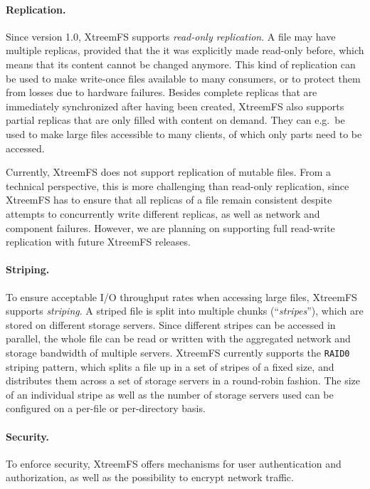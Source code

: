 \documentclass[a4paper,10pt]{book}
\begin{document}
\paragraph{Replication.}
Since version 1.0, XtreemFS supports \emph{read-only replication}. A file may have multiple replicas, provided that the it was explicitly made read-only before, which means that its content cannot be changed anymore. This kind of replication can be used to make write-once files available to many consumers, or to protect them from losses due to hardware failures. Besides complete replicas that are immediately synchronized after having been created, XtreemFS also supports partial replicas that are only filled with content on demand. They can e.g.\ be used to make large files accessible to many clients, of which only parts need to be accessed.

Currently, XtreemFS does not support replication of mutable files. From a technical perspective, this is more challenging than read-only replication, since XtreemFS has to ensure that all replicas of a file remain consistent despite attempts to concurrently write different replicas, as well as network and component failures. However, we are planning on supporting full read-write replication with future XtreemFS releases.

\paragraph{Striping.}
To ensure acceptable I/O throughput rates when accessing large files, XtreemFS supports \emph{striping}. A striped file is split into multiple chunks (``\emph{stripes}''), which are stored on different storage servers. Since different stripes can be accessed in parallel, the whole file can be read or written with the aggregated network and storage bandwidth of multiple servers. XtreemFS currently supports the \texttt{RAID0} striping pattern, which splits a file up in a set of stripes of a fixed size, and distributes them across a set of storage servers in a round-robin fashion. The size of an individual stripe as well as the number of storage servers used can be configured on a per-file or per-directory basis.

\paragraph{Security.}
To enforce security, XtreemFS offers mechanisms for user authentication and authorization, as well as the possibility to encrypt network traffic.
\end{document}
